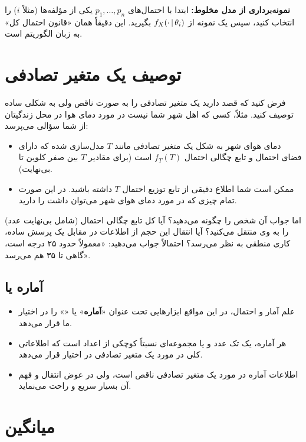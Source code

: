 \begin{note}
\notetitle \textbf{نمونه‌برداری از مدل مخلوط:} ابتدا با احتمال‌های $p_1,\ldots,p_n$ یکی از مؤلفه‌ها (مثلاً $i$) را انتخاب کنید، سپس یک نمونه از $f_X(\cdot\,|\,\theta_i)$ بگیرید. این دقیقاً همان «قانون احتمال کل» به زبان الگوریتم است.
\end{note}

\section{توصیف یک متغیر تصادفی}

فرض کنید که قصد دارید یک متغیر تصادفی را به صورت \textcolor{red!70!black}{ناقص} ولی \textcolor{blue!60!black}{به شکلی ساده} توصیف کنید. مثلاً، کسی که اهل شهر شما نیست در مورد دمای هوا در محل زندگیتان از شما سؤالی می‌پرسد:
\begin{itemize}
\item دمای هوای شهر به شکل یک متغیر تصادفی مانند $T$ مدل‌سازی شده که دارای فضای احتمال و تابع چگالی احتمال $f_T(T)$ است (برای مقادیر $T$ بین صفر کلوین تا بی‌نهایت).
\item ممکن است شما اطلاع دقیقی از تابع توزیع احتمال $T$ داشته باشید. در این صورت تمام چیزی که در مورد دمای هوای شهر می‌توان داشت را دارید.
\end{itemize}
اما جواب آن شخص را چگونه می‌دهید؟ آیا کل تابع چگالی احتمال (شامل بی‌نهایت عدد) را به وی منتقل می‌کنید؟ آیا انتقال این حجم از اطلاعات در مقابل یک پرسش ساده، کاری منطقی به نظر می‌رسد؟ احتمالاً جواب می‌دهید: «معمولاً حدود ۲۵ درجه است، گاهی تا ۳۵ هم می‌رسد».

\subsection{آماره یا }
\begin{itemize}
\item علم آمار و احتمال، در این مواقع ابزارهایی تحت عنوان «\textbf{آماره}» یا «» را در اختیار ما قرار می‌دهد.
\item هر آماره، یک تک عدد و یا مجموعه‌ای نسبتاً کوچکی از اعداد است که اطلاعاتی کلی در مورد یک متغیر تصادفی در اختیار قرار می‌دهد.
\item اطلاعات آماره در مورد یک متغیر تصادفی ناقص است، ولی در عوض انتقال و فهم آن بسیار سریع و راحت می‌نماید.
\end{itemize}

\section{میانگین }

